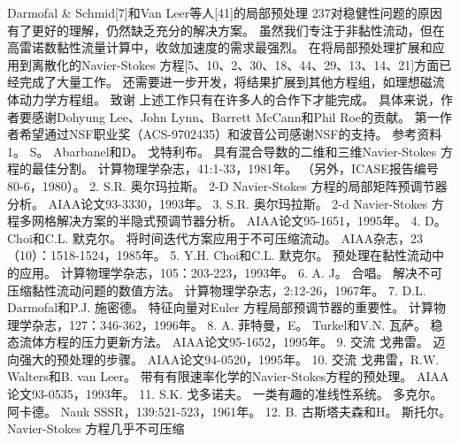 \documentclass[UTF8,11pt,a4paper,openany,fontset=fandol]{ctexbook}
\begin{document}
Darmofal \& Schmid[7]和Van Leer等人[41]的局部预处理 237对稳健性问题的原因有了更好的理解，仍然缺乏充分的解决方案。 虽然我们专注于非黏性流动，但在高雷诺数黏性流量计算中，收敛加速度的需求最强烈。 在将局部预处理扩展和应用到离散化的Navier-Stokes 方程[5、10、2、30、18、44、29、13、14、21]方面已经完成了大量工作。 还需要进一步开发，将结果扩展到其他方程组，如理想磁流体动力学方程组。 致谢 上述工作只有在许多人的合作下才能完成。 具体来说，作者要感谢Dohyung Lee、John Lynn、Barrett McCann和Phil Roe的贡献。 第一作者希望通过NSF职业奖（ACS-9702435）和波音公司感谢NSF的支持。 参考资料1。 S。 Abarbanel和D。 戈特利布。 具有混合导数的二维和三维Navier-Stokes 方程的最佳分割。 计算物理学杂志，41:1-33，1981年。 （另外，ICASE报告编号 80-6，1980）。 2. S.R. 奥尔玛拉斯。 2-D Navier-Stokes 方程的局部矩阵预调节器分析。 AIAA论文93-3330，1993年。 3. S.R. 奥尔玛拉斯。 2-d Navier-Stokes 方程多网格解决方案的半隐式预调节器分析。 AIAA论文95-1651，1995年。 4. D。 Choi和C.L. 默克尔。 将时间迭代方案应用于不可压缩流动。 AIAA杂志，23（10）：1518-1524，1985年。 5. Y.H. Choi和C.L. 默克尔。 预处理在黏性流动中的应用。 计算物理学杂志，105：203-223，1993年。 6. A. J。 合唱。 解决不可压缩黏性流动问题的数值方法。 计算物理学杂志，2:12-26，1967年。 7. D.L. Darmofal和P.J. 施密德。 特征向量对Euler 方程局部预调节器的重要性。 计算物理学杂志，127：346-362，1996年。 8. A. 菲特曼，E。 Turkel和V.N. 瓦萨。 稳态流体方程的压力更新方法。 AIAA论文95-1652，1995年。 9. 交流 戈弗雷。 迈向强大的预处理的步骤。 AIAA论文94-0520，1995年。 10. 交流 戈弗雷，R.W. Walters和B. van Leer。 带有有限速率化学的Navier-Stokes方程的预处理。 AIAA论文93-0535，1993年。 11. S.K. 戈多诺夫。 一类有趣的准线性系统。 多克尔。 阿卡德。 Nauk SSSR，139:521-523，1961年。 12. B. 古斯塔夫森和H。 斯托尔。 Navier-Stokes 方程几乎不可压缩
\end{document}
